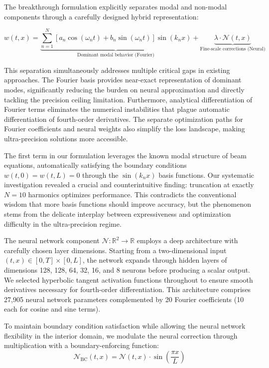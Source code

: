 The breakthrough formulation explicitly separates modal and non-modal components through a carefully designed hybrid representation:

\begin{equation}
w(t,x) = \underbrace{\sum_{n=1}^{N} \left[a_n \cos(\omega_n t) + b_n \sin(\omega_n t)\right] \sin(k_n x)}_{\text{Dominant modal behavior (Fourier)}} + \underbrace{\lambda \cdot \mathcal{N}(t,x)}_{\text{Fine-scale corrections (Neural)}}
\label{eq:hybrid_solution}
\end{equation}

This separation simultaneously addresses multiple critical gaps in existing approaches. The Fourier basis provides near-exact representation of dominant modes, significantly reducing the burden on neural approximation and directly tackling the precision ceiling limitation. Furthermore, analytical differentiation of Fourier terms eliminates the numerical instabilities that plague automatic differentiation of fourth-order derivatives. The separate optimization paths for Fourier coefficients and neural weights also simplify the loss landscape, making ultra-precision solutions more accessible.

The first term in our formulation leverages the known modal structure of beam equations, automatically satisfying the boundary conditions $w(t,0) = w(t,L) = 0$ through the $\sin(k_n x)$ basis functions. Our systematic investigation revealed a crucial and counterintuitive finding: truncation at exactly $N=10$ harmonics optimizes performance. This contradicts the conventional wisdom that more basis functions should improve accuracy, but the phenomenon stems from the delicate interplay between expressiveness and optimization difficulty in the ultra-precision regime.

The neural network component $\mathcal{N}: \mathbb{R}^2 \rightarrow \mathbb{R}$ employs a deep architecture with carefully chosen layer dimensions. Starting from a two-dimensional input $(t, x) \in [0, T] \times [0, L]$, the network expands through hidden layers of dimensions 128, 128, 64, 32, 16, and 8 neurons before producing a scalar output. We selected hyperbolic tangent activation functions throughout to ensure smooth derivatives necessary for fourth-order differentiation. This architecture comprises 27,905 neural network parameters complemented by 20 Fourier coefficients (10 each for cosine and sine terms).

To maintain boundary condition satisfaction while allowing the neural network flexibility in the interior domain, we modulate the neural correction through multiplication with a boundary-enforcing function:
\begin{equation}
\mathcal{N}_{\text{BC}}(t,x) = \mathcal{N}(t,x) \cdot \sin\left(\frac{\pi x}{L}\right)
\end{equation}

